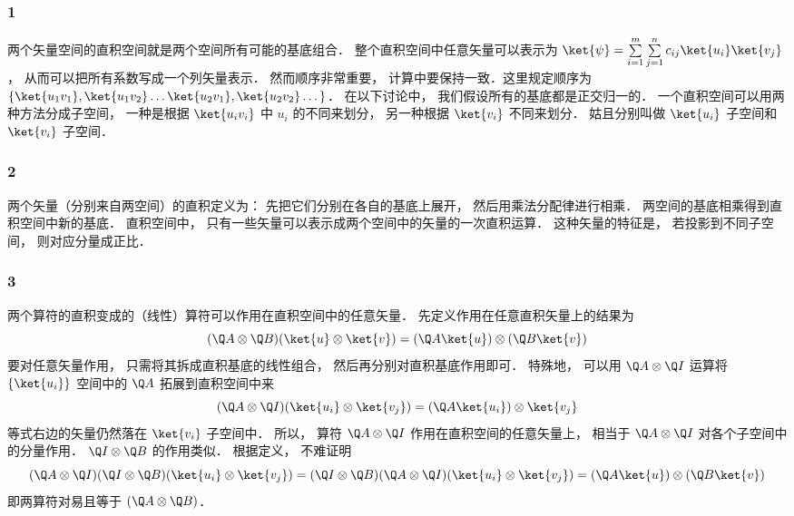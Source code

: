 
\subsubsection{1}
两个矢量空间的直积空间就是两个空间所有可能的基底组合． 整个直积空间中任意矢量可以表示为 $\ket{\psi} = \sum\limits_{i = 1}^m  \sum\limits_{j = 1}^n c_{ij}\ket{u_i}\ket{v_j} $，  从而可以把所有系数写成一个列矢量表示． 然而顺序非常重要， 计算中要保持一致．这里规定顺序为 $\{ \ket{u_1 v_1}, \ket{u_1 v_2}\dots \ket{u_2 v_1}, \ket{u_2 v_2}\dots \}$． 在以下讨论中， 我们假设所有的基底都是正交归一的． 一个直积空间可以用两种方法分成子空间， 一种是根据 $\ket{u_i v_i}$ 中 $u_i$  的不同来划分， 另一种根据 $\ket{v_i}$ 不同来划分． 姑且分别叫做 $\ket{u_i}$ 子空间和 $\ket{v_i}$ 子空间．

\subsubsection{2}
两个矢量（分别来自两空间）的直积定义为： 先把它们分别在各自的基底上展开， 然后用乘法分配律进行相乘． 两空间的基底相乘得到直积空间中新的基底． 直积空间中， 只有一些矢量可以表示成两个空间中的矢量的一次直积运算． 这种矢量的特征是， 若投影到不同子空间， 则对应分量成正比．

\subsubsection{3}
两个算符的直积变成的（线性）算符可以作用在直积空间中的任意矢量． 先定义作用在任意直积矢量上的结果为
\begin{equation}
(\Q A \otimes \Q B) (\ket{u} \otimes \ket{v}) = (\Q A \ket{u}) \otimes (\Q B \ket{v})
\end{equation}
要对任意矢量作用， 只需将其拆成直积基底的线性组合， 然后再分别对直积基底作用即可． 特殊地， 可以用 $\Q A \otimes \Q I$ 运算将 $\{\ket{u_i}\}$  空间中的 $\Q A$ 拓展到直积空间中来
\begin{equation}
(\Q A \otimes \Q I)(\ket{u_i} \otimes \ket{v_j}) = (\Q A \ket{u_i}) \otimes \ket{v_j} 
\end{equation}
等式右边的矢量仍然落在 $\ket{v_i}$ 子空间中． 所以， 算符 $\Q A \otimes \Q I$ 作用在直积空间的任意矢量上， 相当于 $\Q A \otimes \Q I$ 对各个子空间中的分量作用． $\Q I \otimes \Q B$ 的作用类似． 根据定义， 不难证明
\begin{equation}
(\Q A \otimes \Q I)(\Q I \otimes \Q B)(\ket{u_i} \otimes \ket{v_j}) = (\Q I \otimes \Q B)(\Q A \otimes \Q I)(\ket{u_i} \otimes \ket{v_j}) = (\Q A \ket{u}) \otimes (\Q B \ket{v})
\end{equation}
即两算符对易且等于 $(\Q A \otimes \Q B)$． 

